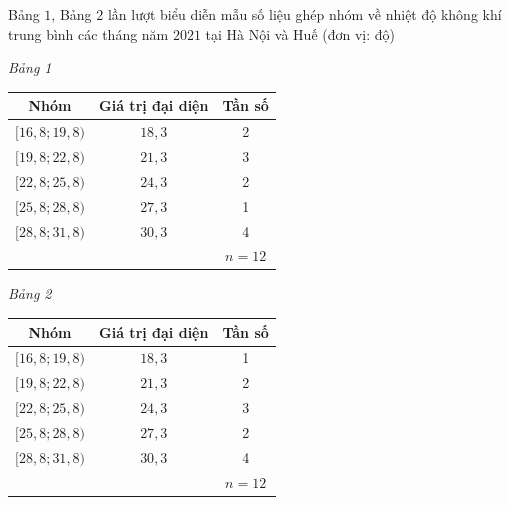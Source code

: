 \begin{bt}%

	Bảng $1$, Bảng $2$ lần lượt biểu diễn mẫu số liệu ghép nhóm về nhiệt độ không khí trung bình các tháng năm $2021$ tại Hà Nội và Huế (đơn vị: độ)
	\begin{center}
		\begin{minipage}[t]{0.45\textwidth}
			\centering
			{\it Bảng 1}\\
			\vspace{0.2cm}
			\begin{tabular}{|c|c|c|}
				\hline
				Nhóm & Giá trị đại diện & Tần số \\
				\hline
				$[16{,}8; 19{,}8)$ & $18{,}3$ & 2 \\
				{$[19{,}8; 22{,}8)$} & $21{,}3$ & 3 \\
				{$[22{,}8; 25{,}8)$} & $24{,}3$ & 2 \\
				{$[25{,}8; 28{,}8)$} & $27{,}3$ & 1 \\
				{$[28{,}8; 31{,}8)$} & $30{,}3$ & 4 \\
				\hline
				& &$n=12$ \\
				\hline
			\end{tabular}
		\end{minipage}			
		\hspace{0.05\textwidth}
		\begin{minipage}[t]{0.45\textwidth}
			\centering
			{\it Bảng 2}\\
			\vspace{0.2cm}
			\begin{tabular}{|c|c|c|}
				\hline
				Nhóm & Giá trị đại diện & Tần số \\
				\hline
				$[16{,}8; 19{,}8)$ & $18{,}3$ & 1 \\
				{$[19{,}8; 22{,}8)$} & $21{,}3$ & 2 \\
				{$[22{,}8; 25{,}8)$} & $24{,}3$ & 3 \\
				{$[25{,}8; 28{,}8)$} & $27{,}3$ & 2 \\
				{$[28{,}8; 31{,}8)$} & $30{,}3$ & 4 \\
				\hline
				& &$n=12$ \\
				\hline			
			\end{tabular}
		\end{minipage}
	\end{center}
	

\end{bt}
